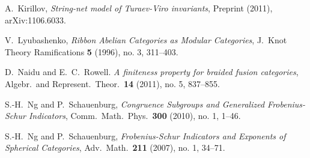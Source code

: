 \documentclass{amsart}
\begin{document}
\begin{thebibliography}{9999}

 A.\ Kirillov, \emph{String-net model of {Turaev-Viro} invariants}, Preprint (2011), arXiv:1106.6033.






 V.\ Lyubashenko, \emph{Ribbon Abelian Categories as Modular Categories}, J.\ Knot Theory Ramifications \textbf{5} (1996), no. 3, 311--403.

 D.\ Naidu and E.\ C.\ Rowell. \emph{A finiteness property for braided fusion categories}, Algebr.\ and Represent.\ Theor.\ \textbf{14} (2011), no. 5, 837--855.

 S.-H.\ Ng and P.\ Schauenburg, \emph{Congruence Subgroups and Generalized {Frobenius-Schur} Indicators}, Comm.\ Math.\ Phys.\ \textbf{300} (2010), no. 1, 1--46.

 S.-H.\ Ng and P.\ Schauenburg, \emph{{Frobenius-Schur} Indicators and Exponents of Spherical Categories}, Adv.\ Math.\ \textbf{211} (2007), no. 1, 34--71.




\end{thebibliography}
\end{document}
